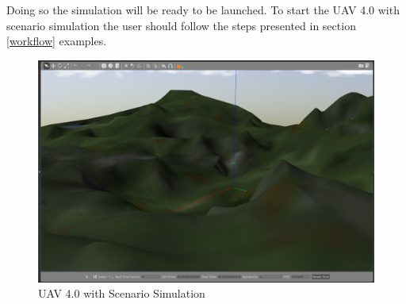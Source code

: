 Doing so the simulation will be ready to be launched. To start the UAV 4.0 with scenario simulation the user should follow the steps presented in section \ref{workflow} examples.

			\begin{figure}[!ht]
	\centering
	\includegraphics[width=350pt]{figuras/exhill.png}
	\caption{UAV 4.0 with Scenario Simulation}
	\label{exhill}
\end{figure}